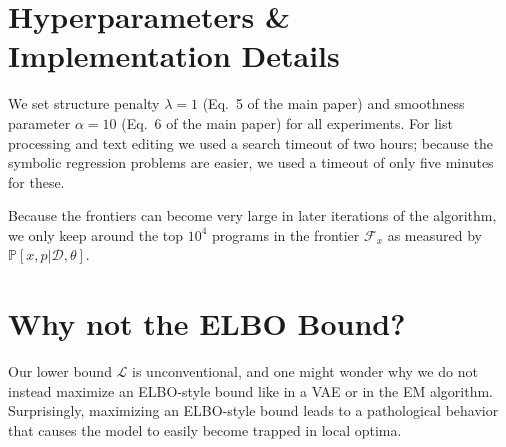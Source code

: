 \documentclass{article}
\newcommand{\lowerBound}{\mathscr{L}}
\newcommand{\probability}{\mathds{P}} %
\begin{document}

\vfill

\section{Hyperparameters \& Implementation Details}
We set structure penalty $\lambda = 1$ (Eq.~5 of the main paper) and
smoothness parameter $\alpha = 10$ (Eq.~6 of the main paper)
for all experiments.
For list processing and text editing we used a search timeout of two hours;
because the symbolic regression problems are easier,
we used a timeout of only five minutes for these.


Because the frontiers can become very large in later iterations of the algorithm,
we only keep around the top $10^4$ programs in the frontier $\mathcal{F}_x$ as measured by $\probability[x,p|\mathcal{D},\theta]$.




\section{Why not the ELBO Bound?}

Our lower bound $\lowerBound$ is unconventional,
and one might wonder why we do not instead maximize an ELBO-style bound like in a VAE or in the EM algorithm.
Surprisingly, maximizing an ELBO-style bound
leads to a pathological behavior that  causes the model to easily become trapped in local optima.
\end{document}

